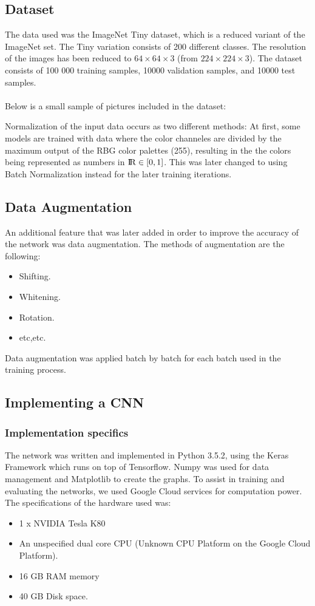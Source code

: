 \documentclass{kthreport}
\begin{document}
\subsection{Dataset}
The data used was the ImageNet Tiny dataset, which is a reduced variant of the ImageNet set. The Tiny variation consists of 200 different classes. The resolution of the images has been reduced to $64\times64\times3$ (from  $224\times224\times3$). The dataset consists of 100 000 training samples, 10000 validation samples, and 10000 test samples.
\\\\
Below is a small sample of pictures included in the dataset:

\FloatBarrier
Normalization of the input data occurs as two different methods: At first, some models are trained with data where the color channeles are divided by the maximum output of the RBG color palettes (255), resulting in the the colors being represented as numbers in ${\rm I\!R} \in [0,1]$. 
This was later changed to using Batch Normalization instead for the later training iterations.  

\subsection{Data Augmentation}
An additional feature that was later added in order to improve the accuracy of the network was data augmentation. The methods of augmentation are the following:\\
\begin{itemize}
\item Shifting.
\item Whitening.
\item Rotation.
\item etc,etc.
\end{itemize}
Data augmentation was applied batch by batch for each batch used in the training process.

\subsection{Implementing a CNN}

\subsubsection{Implementation specifics}

The network was written and implemented in Python 3.5.2, using the Keras Framework which runs on top of Tensorflow. Numpy was used for data management and Matplotlib to create the graphs. To assist in training and evaluating the networks, we used Google Cloud services for computation power. The specifications of the hardware used was:
\begin{itemize}
\item 1 x NVIDIA Tesla K80
\item An unspecified dual core CPU (Unknown CPU Platform on the Google Cloud Platform). 
\item 16 GB RAM memory
\item 40 GB Disk space.
\end{itemize}
\end{document}
